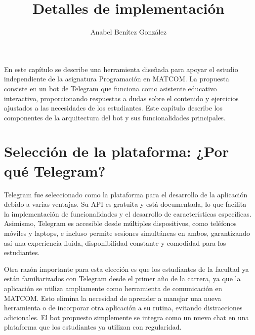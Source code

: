 \documentclass{article}
\title{Detalles de implementación}
\author{Anabel Benítez González}
\date{}
\begin{document}
\maketitle

En este capítulo se describe una herramienta diseñada para apoyar el estudio independiente de  la asignatura Programación en \mbox{MATCOM}. La propuesta consiste en un bot de Telegram que funciona como asistente educativo interactivo, proporcionando respuestas a dudas sobre el contenido y ejercicios ajustados a las necesidades de los estudiantes. Este capítulo describe los componentes de la arquitectura del bot y sus funcionalidades principales.

\section{Selección de la plataforma: ¿Por qué Telegram?}

Telegram fue seleccionado como la plataforma para el desarrollo de la aplicación debido a varias ventajas. Su API es gratuita y está documentada, lo que facilita la implementación de funcionalidades y el desarrollo de características específicas. Asimismo, Telegram es accesible desde múltiples dispositivos, como teléfonos móviles y laptops, e incluso permite sesiones simultáneas en ambos, garantizando así una experiencia fluida, disponibilidad constante y comodidad para los estudiantes.

Otra razón importante para esta elección es que los estudiantes de la facultad ya están familiarizados con Telegram desde el primer año de la carrera, ya que la aplicación se utiliza ampliamente como herramienta de comunicación en MATCOM. Esto elimina la necesidad de aprender a manejar una nueva herramienta o de incorporar otra aplicación a su rutina, evitando distracciones adicionales. El bot propuesto simplemente se integra como un nuevo chat en una plataforma que los estudiantes ya utilizan con regularidad.



\end{document}
